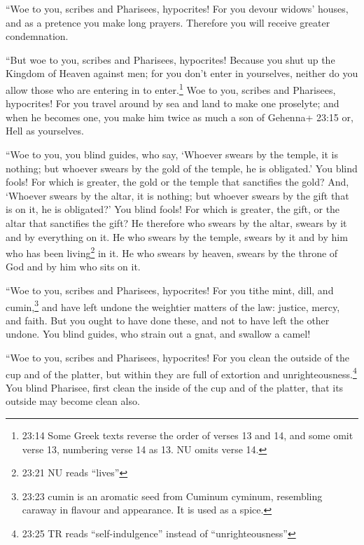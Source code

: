  ``Woe to you, scribes and Pharisees, hypocrites! For you
devour widows' houses, and as a pretence you make long prayers.
Therefore you will receive greater condemnation.

 ``But woe to you, scribes and Pharisees, hypocrites!
Because you shut up the Kingdom of Heaven against men; for you don't
enter in yourselves, neither do you allow those who are entering in to
enter.\footnote{23:14 Some Greek texts reverse the order of verses 13
  and 14, and some omit verse 13, numbering verse 14 as 13. NU omits
  verse 14.}  Woe to you, scribes and Pharisees,
hypocrites! For you travel around by sea and land to make one proselyte;
and when he becomes one, you make him twice as much a son of Gehenna+
23:15 or, Hell as yourselves.

 ``Woe to you, you blind guides, who say, `Whoever swears
by the temple, it is nothing; but whoever swears by the gold of the
temple, he is obligated.'  You blind fools! For which is
greater, the gold or the temple that sanctifies the gold? 
And, `Whoever swears by the altar, it is nothing; but whoever swears by
the gift that is on it, he is obligated?'  You blind fools!
For which is greater, the gift, or the altar that sanctifies the gift?
 He therefore who swears by the altar, swears by it and by
everything on it.  He who swears by the temple, swears by
it and by him who has been living\footnote{23:21 NU reads ``lives''} in
it.  He who swears by heaven, swears by the throne of God
and by him who sits on it.

 ``Woe to you, scribes and Pharisees, hypocrites! For you
tithe mint, dill, and cumin,\footnote{23:23 cumin is an aromatic seed
  from Cuminum cyminum, resembling caraway in flavour and appearance. It
  is used as a spice.} and have left undone the weightier matters of the
law: justice, mercy, and faith. But you ought to have done these, and
not to have left the other undone.  You blind guides, who
strain out a gnat, and swallow a camel!

 ``Woe to you, scribes and Pharisees, hypocrites! For you
clean the outside of the cup and of the platter, but within they are
full of extortion and unrighteousness.\footnote{23:25 TR reads
  ``self-indulgence'' instead of ``unrighteousness''}  You
blind Pharisee, first clean the inside of the cup and of the platter,
that its outside may become clean also.

